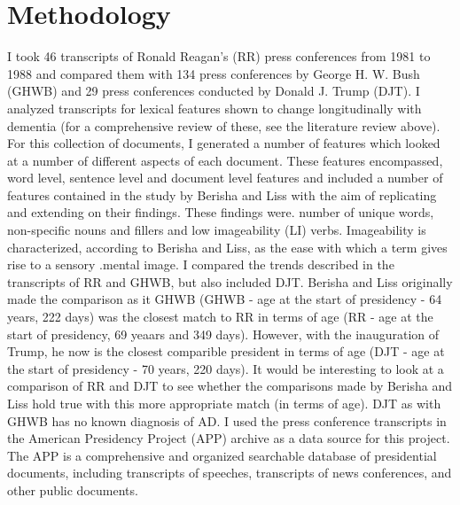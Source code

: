 \documentclass[10pt]{article}
\begin{document}
\section{Methodology}
I took 46 transcripts of Ronald Reagan’s (RR) press conferences from 1981 to 1988 and compared them with 134 press conferences by George H. W. Bush (GHWB) and 29 press conferences conducted by Donald J. Trump (DJT).  I analyzed transcripts for lexical features shown to change longitudinally with dementia  (for a comprehensive review of these, see the literature review above). For this collection of documents, I generated a number of features which looked at a number of different aspects of each document. These features encompassed, word level, sentence level and document level features and included a number of features contained in the study by Berisha and Liss with the aim of replicating and extending on their findings. These findings were. number of unique words, non-specific nouns and fillers and low imageability (LI) verbs. Imageability is characterized, according to Berisha and Liss, as the ease with which a term gives rise to a sensory .mental image. I compared the trends described in the transcripts of RR and GHWB, but also included DJT. Berisha and Liss originally made the comparison as it GHWB (GHWB - age at the start of presidency - 64 years, 222 days) was the closest match to RR in terms of age (RR  - age at the start of presidency, 69 yeaars and 349 days). However, with the inauguration of Trump, he now is the closest comparible president in terms of age (DJT - age at the start of presidency - 70 years, 220 days). It would be interesting to look at a comparison of RR and DJT to see whether the comparisons made by Berisha and Liss hold true with this more appropriate match (in terms of age). DJT as with GHWB has no known diagnosis of AD. I used the press conference transcripts in the American Presidency Project (APP) archive as a data source for this project. The APP is a comprehensive and organized searchable database of presidential documents, including transcripts of speeches, transcripts of news conferences, and other public documents.
\end{document}
